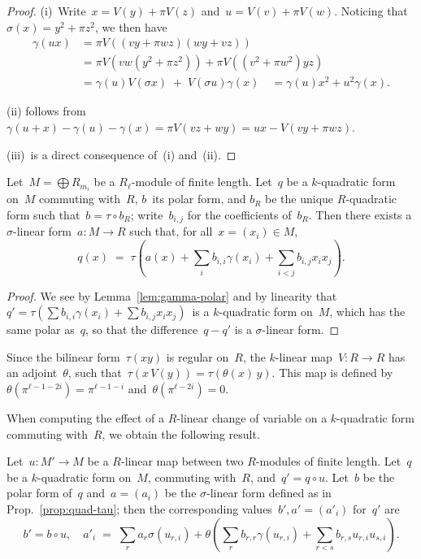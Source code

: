 \documentclass{article}%
\def\pa#1{\left(#1\right)}
\begin{document}
\begin{proof}
(i)~Write~$x = V(y) + π V(z)$ and~$u = V(v) + π V(w)$. Noticing
that~$σ(x) = y^2 + π z^2$, we then have
\begin{equation}\label{eq:gamma-prod}
\begin{split}
γ(ux) &= π V\pa{(vy + π wz)(wy+vz)}\\
 &= π V\pa{vw (y^2 + π z^2)} + π V \pa{(v^2+πw^2) yz}\\
 &= γ(u) V(σx) \;+\; V(σu) γ(x) \quad = γ(u) x^2 + u^2 γ(x).
\end{split}
\end{equation}

(ii) follows from
$γ(u+x) - γ(u) - γ(x) = π V(vz + wy) = ux - V(vy+πwz)$.

(iii)~is a direct consequence of~(i) and~(ii).
\end{proof}%
\begin{prop}\label{prop:quad-tau}%
Let~$M = ⨁ R_{m_i}$ be a $R_ℓ$-module of finite length.
Let~$q$ be a $k$-quadratic form on~$M$ commuting with~$R$, $b$~its
polar form, and $b_R$ be the unique $R$-quadratic form such that~$b = τ ∘
b_R$; write~$b_{i,j}$ for the coefficients of~$b_R$.
Then there exists a $σ$-linear form~$a: M → R$ such that, for all~$x =
(x_i) ∈ M$,
\begin{equation}
q(x) \;=\; τ\pa{a(x) + ∑_{i} b_{i,i} γ(x_i) + ∑_{i < j} b_{i,j} x_i x_j}.
\end{equation}
\end{prop}

\begin{proof}
We see by Lemma~\ref{lem:gamma-polar} and by linearity that
$q' = τ(∑ b_{i,i} γ(x_i) + ∑ b_{i,j} x_i x_j)$~is a $k$-quadratic form on~$M$,
which has the same polar as~$q$,
so that the difference~$q - q'$ is a $σ$-linear form.
\end{proof}%

Since the bilinear form~$τ(x y)$ is regular on~$R$, the $k$-linear
map~$V: R → R$ has an adjoint~$θ$, such that~$τ(x\, V(y)) = τ(θ(x)\, y)$.
This map is defined by~$θ(π^{ℓ-1-2i}) = π^{ℓ-1-i}$ and~$θ(π^{ℓ-2i}) = 0$.

When computing the effect of a $R$-linear change of variable on a
$k$-quadratic form commuting with~$R$, we obtain the following result.

\begin{prop}\label{prop:quad-changevar}%
Let~$u: M' → M$ be a $R$-linear map between two $R$-modules of finite length.
Let~$q$ be a $k$-quadratic form on~$M$, commuting with~$R$, and~$q' = q ∘ u$.
Let~$b$ be the polar form of~$q$ and~$a = (a_i)$ be the $σ$-linear form defined
as in Prop.~\ref{prop:quad-tau}; then the corresponding values~$b', a' =
(a'_i)$
for~$q'$ are
\begin{equation*}
b' = b ∘ u, \quad
a'_i \;=\; ∑_r a_r σ(u_{r,i})
  + θ \pa{ ∑_r b_{r,r} γ(u_{r,i}) + ∑_{r < s} b_{r,s} u_{r,i} u_{s,i} }.
\end{equation*}
\end{prop}%
\end{document}
